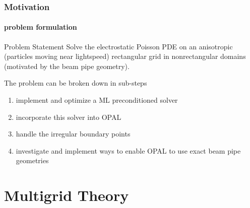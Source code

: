 \documentclass[xcolor=pdftex,table,10pt]{beamer}
\begin{document}
	\begin{frame}

		\frametitle{Motivation}
		\framesubtitle{problem formulation}

		\begin{block}{Problem Statement}
		Solve the electrostatic Poisson PDE on an anisotropic (particles moving near lightspeed) rectangular grid in nonrectangular domains (motivated by the beam pipe geometry).
		\end{block}

		\pause
		\vspace{0.9cm}

		The problem can be broken down in sub-steps

		\begin{enumerate}
			\item implement and optimize a ML preconditioned solver
			\item incorporate this solver into OPAL
			\item handle the irregular boundary points
			\item investigate and implement ways to enable OPAL to use exact beam pipe geometries
		\end{enumerate}

	\end{frame}

    \section{Multigrid Theory}
\end{document}
